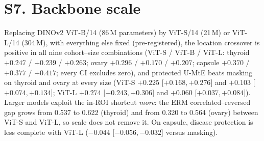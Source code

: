 \section*{S7. Backbone scale}\label{supp:S7}
Replacing DINOv2 ViT-B/14 (86\,M parameters) by ViT-S/14 (21\,M) or ViT-L/14 (304\,M), with everything else fixed
(pre-registered), the location crossover is positive in all nine cohort--size combinations (ViT-S / ViT-B / ViT-L:
thyroid $+0.247$ / $+0.239$ / $+0.263$; ovary $+0.296$ / $+0.170$ / $+0.207$; capsule $+0.370$ / $+0.377$ /
$+0.417$; every CI excludes zero), and protected U-MtE beats masking on thyroid and ovary at every size (ViT-S
$+0.225$ [$+0.168, +0.276$] and $+0.103$ [$+0.074, +0.134$]; ViT-L $+0.274$ [$+0.243, +0.306$] and $+0.060$
[$+0.037, +0.084$]). Larger models exploit the in-ROI shortcut \emph{more}: the ERM correlated--reversed gap grows
from 0.537 to 0.622 (thyroid) and from 0.320 to 0.564 (ovary) between ViT-S and ViT-L, so scale does not remove it.
On capsule, disease protection is less complete with ViT-L ($-0.044$ [$-0.056, -0.032$] versus masking).

